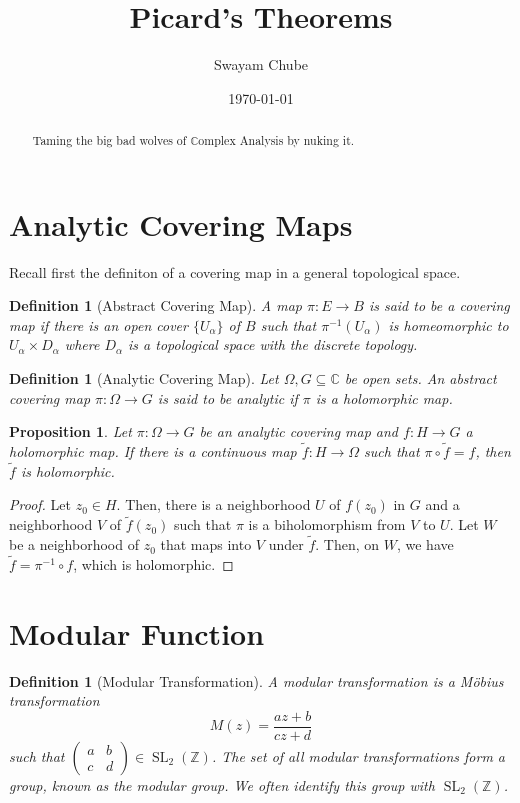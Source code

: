 \documentclass[12pt]{article}
\title{Picard's Theorems}
\author{Swayam Chube}
\date{\today}
\theoremstyle{thmstyle}
\newtheorem{proposition}[theorem]{Proposition}
\theoremstyle{defstyle}
\newtheorem{definition}[theorem]{Definition}
\newcommand{\Z}{\mathbb{Z}}
\newcommand{\bbC}{\mathbb{C}}
\newcommand{\wt}[1]{\widetilde{#1}}
\begin{document}
\maketitle
\begin{abstract}
    Taming the big bad wolves of $\bbC$omplex Analysis by nuking it.
\end{abstract}

\section{Analytic Covering Maps}

Recall first the definiton of a covering map in a general topological space. 
\begin{definition}[Abstract Covering Map]
    A map $\pi: E\to B$ is said to be a \emph{covering map} if there is an open cover $\{U_\alpha\}$ of $B$ such that $\pi^{-1}(U_\alpha)$ is homeomorphic to $U_\alpha\times D_\alpha$ where $D_\alpha$ is a topological space with the discrete topology.
\end{definition}

\begin{definition}[Analytic Covering Map]
    Let $\Omega,G\subseteq\bbC$ be open sets. An abstract covering map $\pi: \Omega\to G$ is said to be \emph{analytic} if $\pi$ is a holomorphic map.
\end{definition}

\begin{proposition}
    Let $\pi: \Omega\to G$ be an analytic covering map and $f: H\to G$ a holomorphic map. If there is a continuous map $\wt f: H\to\Omega$ such that $\pi\circ\wt f = f$, then $\wt f$ is holomorphic.
\end{proposition}
\begin{proof}
    Let $z_0\in H$. Then, there is a neighborhood $U$ of $f(z_0)$ in $G$ and a neighborhood $V$ of $\wt f(z_0)$ such that $\pi$ is a biholomorphism from $V$ to $U$. Let $W$ be a neighborhood of $z_0$ that maps into $V$ under $\wt f$. Then, on $W$, we have $\wt f = \pi^{-1}\circ f$, which is holomorphic.
\end{proof}

\section{Modular Function}

\begin{definition}[Modular Transformation]
    A \emph{modular transformation} is a M\"obius transformation 
    \begin{equation*}
        M(z) = \frac{az + b}{cz + d}
    \end{equation*}
    such that $\begin{pmatrix}a & b\\ c & d\end{pmatrix}\in\operatorname{SL}_2(\Z)$. The set of all modular transformations form a group, known as the \emph{modular group}. We often identify this group with $\operatorname{SL}_2(\Z)$.
\end{definition}
\end{document}
